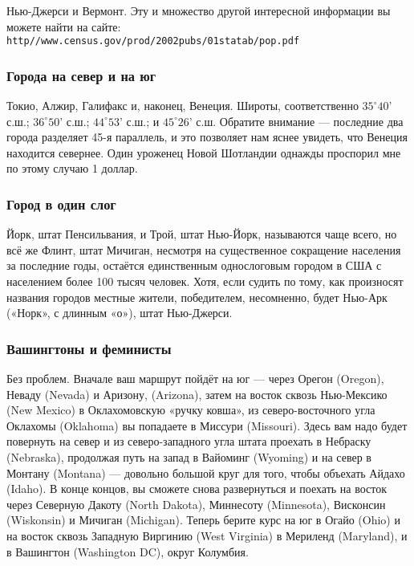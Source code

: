Нью-Джерси и Вермонт.
Эту и множество другой интересной информации вы можете найти на сайте:\\
\texttt{http//www.census.gov/prod/2002pubs/01statab/pop.pdf} 
 \heart                          

\subsubsection*{Города на север и на юг}%

Токио, Алжир, Галифакс и, наконец, Венеция.
Широты, соответственно
$35^\circ 40’$ с.ш.; $36^\circ 50’$ с.ш.; $44^\circ 53’$ с.ш.; и $45^\circ 26’$ с.ш.
Обратите внимание --- последние два города разделяет 45-я параллель, и это позволяет нам яснее увидеть, что Венеция находится севернее.
Один уроженец Новой Шотландии однажды проспорил мне по этому случаю 1 доллар.%
\heart

\subsubsection*{Город в один слог}%

Йорк, штат Пенсильвания, и Трой, штат Нью-Йорк, называются чаще всего, но всё же Флинт, штат Мичиган, несмотря на существенное сокращение населения за последние годы, остаётся единственным однослоговым городом в США с населением более 100 тысяч человек.
Хотя, если судить по тому, как произносят названия городов местные жители, победителем, несомненно, будет Нью-Арк («Норк», с длинным «о»), штат Нью-Джерси.
\heart

\subsubsection*{Вашингтоны и феминисты} %

Без проблем.
Вначале ваш маршрут пойдёт на юг --- через Орегон (Oregon), 
Неваду (Nevada) 
и Аризону, (Arizona), 
затем на восток сквозь Нью-Мексико (New Mexico) 
в Оклахомовскую «ручку ковша», из северо-восточного угла Оклахомы (Oklahoma) 
вы попадаете в Миссури (Missouri).
Здесь вам надо будет повернуть на север и из северо-западного угла штата проехать в Небраску (Nebraska), продолжая путь на запад в Вайоминг (Wyoming) и на север в Монтану (Montana) --- довольно большой круг для того, чтобы объехать Айдахо (Idaho).
В конце концов, вы сможете снова развернуться и поехать на восток через Северную Дакоту (North Dakota), 
Миннесоту (Minnesota), 
Висконсин (Wiskonsin) 
и Мичиган (Michigan).
Теперь берите курс на юг в Огайо (Ohio) и на восток сквозь Западную Виргинию (West Virginia) в Мериленд (Maryland),
 и в Вашингтон (Washington DC), округ Колумбия.\heart

